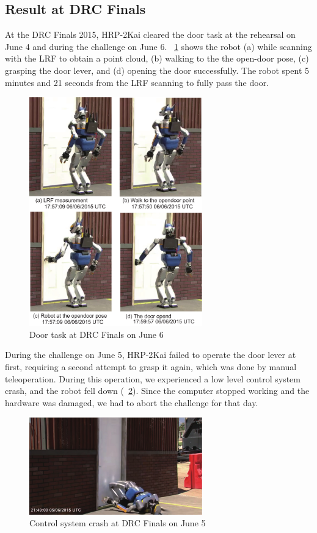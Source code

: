 
\subsection{Result at DRC Finals}
%
At the DRC Finals 2015, HRP-2Kai cleared the door task at the rehearsal on June 4 and during
the challenge on June 6.
\figurename~\ref{fig:drc_door_aist_day2} shows the robot (a) while scanning with the LRF to
obtain a point cloud, (b) walking to the the open-door pose, (c) grasping the door lever,
and (d) opening the door successfully.
The robot spent 5 minutes and 21 seconds from the LRF scanning to fully pass the door.
%
\begin{figure}[t]
  \centering
  \includegraphics[width = 7.5cm]{img/drc_door_aist_day2}
  \caption{Door task at DRC Finals on June 6}
  \label{fig:drc_door_aist_day2}
\end{figure}

During the challenge on June 5, HRP-2Kai failed to operate the door lever at first,
requiring a second attempt to grasp it again, which was done by manual teleoperation.
During this operation, we experienced a low level control system crash, and the robot
fell down (\figurename~\ref{fig:drc_door_aist_day1}).
Since the computer stopped working and the hardware was damaged, we had to abort the
challenge for that day. 
%
\begin{figure}[t]
  \centering
  \includegraphics[width = 7.5cm]{img/drc_door_aist_day1}
  \caption{Control system crash at DRC Finals on June 5}
  \label{fig:drc_door_aist_day1}
\end{figure}

